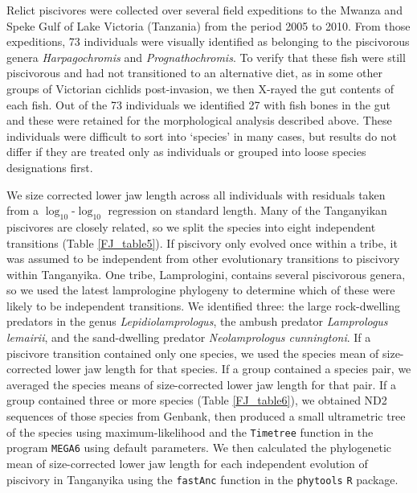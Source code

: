 Relict piscivores were collected over several field expeditions to the Mwanza and Speke Gulf of Lake Victoria (Tanzania) from the period 2005 to 2010. From those expeditions, 73 individuals were visually identified as belonging to the piscivorous genera {\em Harpagochromis} and {\em Prognathochromis}. To verify that these fish were still piscivorous and had not transitioned to an alternative diet, as in some other groups of Victorian cichlids post-invasion, \cite{kishe2008dietary} we then X-rayed the gut contents of each fish. Out of the 73 individuals we identified 27 with fish bones in the gut and these were retained for the morphological analysis described above. These individuals were difficult to sort into `species' in many cases, but results do not differ if they are treated only as individuals or grouped into loose species designations first.

We size corrected lower jaw length across all individuals with residuals taken from a $\log_{10}$-$\log_{10}$ regression on standard length. Many of the Tanganyikan piscivores are closely related, so we split the species into eight independent transitions (Table \ref{FJ_table5}). If piscivory only evolved once within a tribe, it was assumed to be independent from other evolutionary transitions to piscivory within Tanganyika. One tribe, Lamprologini, contains several piscivorous genera, so we used the latest lamprologine phylogeny \cite{sturmbauer2010evolutionary} to determine which of these were likely to be independent transitions. We identified three: the large rock-dwelling predators in the genus {\em Lepidiolamprologus}, the ambush predator {\em Lamprologus lemairii}, and the sand-dwelling predator {\em Neolamprologus cunningtoni}. If a piscivore transition contained only one species, we used the species mean of size-corrected lower jaw length for that species. If a group contained a species pair, we averaged the species means of size-corrected lower jaw length for that pair. If a group contained three or more species (Table \ref{FJ_table6}), we obtained ND2 sequences of those species from Genbank, then produced a small ultrametric tree of the species using maximum-likelihood and the {\tt Timetree} function in the program {\tt MEGA6} using default parameters. \cite{tamura2013mega6} We then calculated the phylogenetic mean of size-corrected lower jaw length for each independent evolution of piscivory in Tanganyika using the {\tt fastAnc} function in the {\tt phytools} \cite{revell2012phytools} {\tt R} package.

